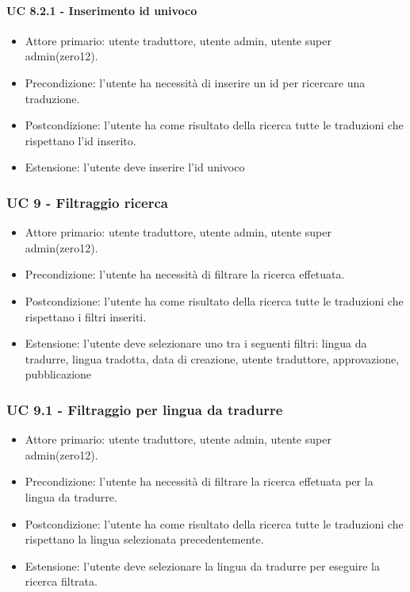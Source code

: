         \paragraph{UC 8.2.1 - Inserimento id univoco}
            \begin{itemize}
                \item Attore primario: utente traduttore, utente admin, utente super admin(zero12).
                \item Precondizione: l'utente ha necessità di inserire un id per ricercare una traduzione.
                \item Postcondizione: l'utente ha come risultato della ricerca tutte le traduzioni che rispettano l'id inserito.
                \item Estensione: l'utente deve inserire l'id univoco
            \end{itemize}
\subsubsection{UC 9 - Filtraggio ricerca}
    \begin{itemize}
        \item Attore primario: utente traduttore, utente admin, utente super admin(zero12).
        \item Precondizione: l'utente ha necessità di filtrare la ricerca effetuata.
        \item Postcondizione: l'utente ha come risultato della ricerca tutte le traduzioni che rispettano i filtri inseriti.
        \item Estensione: l'utente deve selezionare uno tra i seguenti filtri: lingua da tradurre, lingua tradotta, data di creazione, utente traduttore, approvazione, pubblicazione
    \end{itemize}
    \subsubsection{UC 9.1 - Filtraggio per lingua da tradurre}
        \begin{itemize}
            \item Attore primario: utente traduttore, utente admin, utente super admin(zero12).
            \item Precondizione: l'utente ha necessità di filtrare la ricerca effetuata per la lingua da tradurre.
            \item Postcondizione: l'utente ha come risultato della ricerca tutte le traduzioni che rispettano la lingua selezionata precedentemente. 
            \item Estensione: l'utente deve selezionare la lingua da tradurre per eseguire la ricerca filtrata.
        \end{itemize}        
